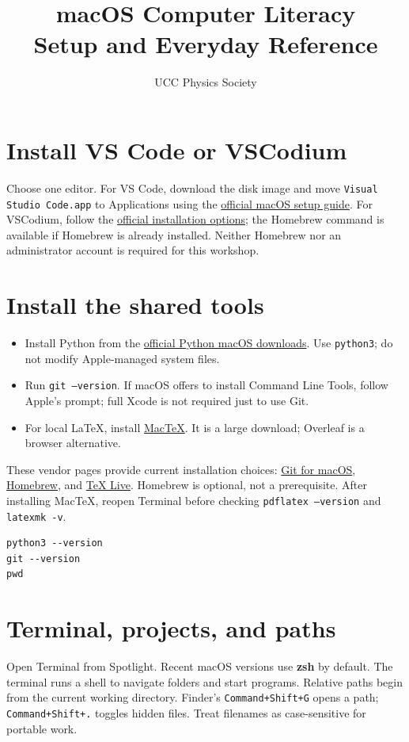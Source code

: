 \documentclass[11pt]{article}
\title{macOS Computer Literacy\\Setup and Everyday Reference}
\author{UCC Physics Society}
\begin{document}
\maketitle

\tableofcontents
\section{Install VS Code or VSCodium}
Choose one editor. For VS Code, download the disk image and move
\texttt{Visual Studio Code.app} to Applications using the
\href{https://code.visualstudio.com/docs/setup/mac}{official macOS setup
guide}. For VSCodium, follow the
\href{https://vscodium.com/#install}{official installation options}; the
Homebrew command is available if Homebrew is already installed. Neither
Homebrew nor an administrator account is required for this workshop.

\section{Install the shared tools}
\begin{itemize}
\item Install Python from the
\href{https://www.python.org/downloads/macos/}{official Python macOS
downloads}. Use \texttt{python3}; do not modify Apple-managed system files.
\item Run \texttt{git --version}. If macOS offers to install Command Line
Tools, follow Apple's prompt; full Xcode is not required just to use Git.
\item For local LaTeX, install
\href{https://tug.org/mactex/}{MacTeX}. It is a large download; Overleaf is a
browser alternative.
\end{itemize}
These vendor pages provide current installation choices:
\href{https://git-scm.com/download/mac}{Git for macOS},
\href{https://brew.sh/}{Homebrew}, and
\href{https://tug.org/texlive/}{TeX Live}. Homebrew is optional, not a
prerequisite. After installing MacTeX, reopen Terminal before checking
\texttt{pdflatex --version} and \texttt{latexmk -v}.

\begin{lstlisting}
python3 --version
git --version
pwd
\end{lstlisting}


\newpage

\section{Terminal, projects, and paths}
Open Terminal from Spotlight. Recent macOS versions use \textbf{zsh} by
default. The terminal runs a shell to navigate folders and start programs.
Relative paths begin from the current working directory. Finder's
\texttt{Command+Shift+G} opens a path; \texttt{Command+Shift+.} toggles hidden
files. Treat filenames as case-sensitive for portable work.
\end{document}

